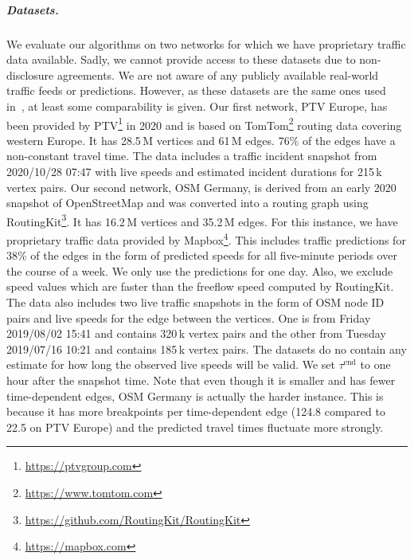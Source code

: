 \documentclass[a4paper,UKenglish,cleveref, autoref, thm-restate,anonymous]{lipics-v2021}
\newcommand*{\tend}{\tau^{\operatorname{end}}}
\begin{document}
\subparagraph{Datasets.}
We evaluate our algorithms on two networks for which we have proprietary traffic data available.
Sadly, we cannot provide access to these datasets due to non-disclosure agreements.
We are not aware of any publicly available real-world traffic feeds or predictions.
However, as these datasets are the same ones used in~\cite{swz-sfert-21,strasser_et_al:LIPIcs.SEA.2021.6}, at least some comparability is given.
%
Our first network, PTV Europe, has been provided by PTV\footnote{\url{https://ptvgroup.com}} in 2020 and is based on TomTom\footnote{\url{https://www.tomtom.com}} routing data covering western Europe.
It has 28.5\,M vertices and 61\,M edges.
76\% of the edges have a non-constant travel time.
The data includes a traffic incident snapshot from 2020/10/28 07:47 with live speeds and estimated incident durations for 215\,k vertex pairs.
%
Our second network, OSM Germany, is derived from an early 2020 snapshot of OpenStreetMap and was converted into a routing graph using RoutingKit\footnote{\url{https://github.com/RoutingKit/RoutingKit}}.
It has 16.2\,M vertices and 35.2\,M edges.
For this instance, we have proprietary traffic data provided by Mapbox\footnote{\url{https://mapbox.com}}.
This includes traffic predictions for 38\% of the edges in the form of predicted speeds for all five-minute periods over the course of a week.
We only use the predictions for one day.
Also, we exclude speed values which are faster than the freeflow speed computed by RoutingKit.
The data also includes two live traffic snapshots in the form of OSM node ID pairs and live speeds for the edge between the vertices.
One is from Friday 2019/08/02 15:41 and contains 320\,k vertex pairs and the other from Tuesday 2019/07/16 10:21 and contains 185\,k vertex pairs.
The datasets do no contain any estimate for how long the observed live speeds will be valid.
We set $\tend$ to one hour after the snapshot time.
Note that even though it is smaller and has fewer time-dependent edges, OSM Germany is actually the harder instance.
This is because it has more breakpoints per time-dependent edge (124.8 compared to 22.5 on PTV Europe) and the predicted travel times fluctuate more strongly.
\end{document}
